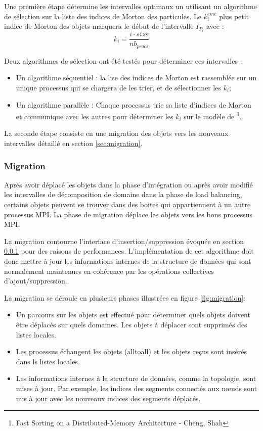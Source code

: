 Une première étape détermine les intervalles optimaux un utilisant un algorithme de sélection sur la liste des indices de Morton des particules. Le $k_i^{eme}$ plus petit indice de Morton des objets marquera le début de l'intervalle $I_{P_i}$ avec : 
\begin{equation}
    k_i=\frac{i \cdot size}{nb_{procs}}
\end{equation}

Deux algorithmes de sélection ont été testés pour déterminer ces intervalles : 
\begin{itemize}
	\item Un algorithme séquentiel : la lise des indices de Morton est rassemblée sur un unique processus qui se chargera de les trier, et de sélectionner les $k_i$;
	\item Un algorithme parallèle : Chaque processus trie sa liste d'indices de Morton et communique avec les autres pour déterminer les $k_i$ sur le modèle de  \footnote{Fast Sorting on a Distributed-Memory Architecture - Cheng, Shah}. 
\end{itemize}

La seconde étape consiste en une migration des objets vers les nouveaux intervalles détaillé en section \ref{sec:migration}.

\newcommand*\circled[1]{\tikz[baseline=(char.base)]{ \node[shape=circle,draw,inner sep=1pt] (char) {#1};} }
\subsubsection{Migration}

Après avoir déplacé les objets dans la phase d'intégration ou après avoir modifié les intervalles de décomposition de domaine dans la phase de load balancing, certains objets peuvent se trouver dans des boites qui appartiennent à un autre processus MPI. La phase de migration déplace les objets vers les bons processus MPI. 

La migration contourne l'interface d'insertion/suppression évoquée en section \ref{} pour des raisons de performances. L'implémentation de cet algorithme doit donc mettre à jour les informations internes de la structure de données qui sont normalement maintenues en cohérence par les opérations collectives d'ajout/suppression.

La migration se déroule en plusieurs phases illustrées en figure \ref{fig:migration}:
\begin{itemize}
	\item \circled{1} Un parcours sur les objets est effectué pour déterminer quels objets doivent être déplacés sur quels domaines. Les objets à déplacer sont supprimés des listes locales.
	\item \circled{2} Les processus échangent les objets (alltoall) et les objets reçus sont insérés dans ls listes locales.
	\item \circled{3} Les informations internes à la structure de données, comme la topologie, sont mises à jour. Par exemple, les indices des segments connectés aux nœuds sont mis à jour avec les nouveaux indices des segments déplacés.
\end{itemize}

